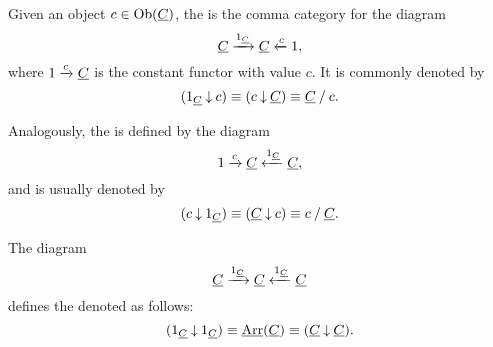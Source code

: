 \begin{examples*}
	\item Given an object \( c \in \Ob(\C) \), the  is the comma category for the diagram
		\[
			\C \tox{1_{\C}} \C \otx{c} 1,
		\]
		where \( 1 \tox{c} \C \) is the constant functor with value \( c \). It is commonly denoted by
		\[
			(1_{\C} \comma c) \equiv (c \comma \C) \equiv \C \slice c.
		\]
	\item Analogously, the  is defined by the diagram
		\[
			1 \tox{c} \C \otx{1_{\C}} \C,
		\]
		and is usually denoted by
		\[
			(c \comma 1_{\C}) \equiv (\C \comma c) \equiv c \slice \C.
		\]
	\item The diagram
		\[
			\C \tox{1_{\C}} \C \otx{1_{\C}} \C
		\]
		defines the  denoted as follows:
		\[
			(1_{\C} \comma 1_{\C}) \equiv \ctrm{Arr}(\C) \equiv (\C \comma \C).
		\]
\end{examples*}